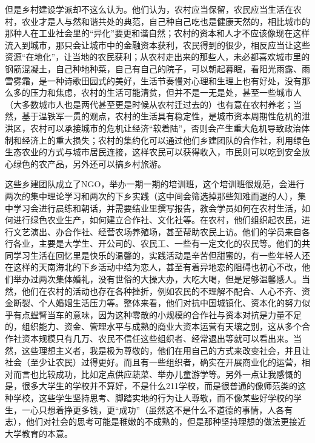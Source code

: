 但是乡村建设学派却不这么认为。他们认为，农村应当保留，农民应当生活在农村，农业才是人与然和谐共处的典范，自己种自己吃也是健康天然的，相比城市的那种人在工业社会里的“异化”要更和谐自然；农村的资本和人才不应该像现在这样流入到城市，那只会让城市中的金融资本获利，农民得到的很少，相反应当让这些资源“在地化”，让当地的农民获利；从农村走出来的那些人，未必都喜欢城市里的钢筋混凝土，自己种地种菜，自己有自己的院子，可以朝起暮眠，看阳光雨露、雨雪雾霜，是一种诗歌田园式的美好，生活节奏慢对心理和生理上也有好处，没有那么多的压力和焦虑，农村的生活可能清贫，但并不是一无是处，甚至一些城市人（大多数城市人也是两代甚至更是时候从农村迁过去的）也有意在农村养老；当然，基于温铁军一贯的观点，农村的生活具有稳定性，是城市资本周期性危机的泄洪区，农村可以承接城市的危机让经济“软着陆”，否则会产生重大危机导致政治体制和经济上的重大损失；农村的集约化可以通过他们乡建团队的合作社，利用绿色生态农业的方式与城市居民连接，这样农民可以获得收入，市民则可以吃到安全放心绿色的农产品，另外还可以搞乡村旅游。

这些乡建团队成立了NGO，举办一期一期的培训班，这个培训班很规范，会进行两次的集中理论学习和两次的下乡实践（这中间会筛选掉那些知难而退的人），集中学习会进行晨练和朝话，并需要结业里撰写报告，教会学员如何在农村生活，如何进行绿色农业生产，如何建立合作社、文化社等。在农村，他们组织起农民，进行文艺演出、办合作社、经营农场养殖场，甚至帮助农民上访。他们的学员来自各行各业，主要是大学生、开公司的、农民工、一些有一定文化的农民等。他们的共同学习生活在回忆里是快乐的温馨的，实践活动是辛苦但甜蜜的，有一些年轻人还在这样的天南海北的下乡活动中结为恋人，甚至有着异地恋的阻碍也初心不改，他们举办过两次集体婚礼，没有世俗的大操大办，大吃大喝，但是足够温馨感人。当然，他们在农村的活动也存在各种挫折，例如农民的不理解不配合、人心不齐、资金断裂、个人婚姻生活压力等。整体来看，他们对抗中国城镇化、资本化的努力似乎有点螳臂当车的意味，因为这种零散的小规模的合作社与资本对抗是力量不足的，组织能力、资金、管理水平与成熟的商业大资本运营有天壤之别，这从多个合作社资本规模只有几万、农民不信任这些组织者、经常退出等就可以看出来。当然，这些理想主义者，我是极为尊敬的，他们在用自己的方式来改变社会，并且让社会（至少让农民）过得更好。而且有一些组织者，确实在开展商业化的运营，相对而言也比较成功，比如定点供应蔬菜、举办儿童游学等。另外一点让我感慨的是，很多大学生的学校并不算好，不是什么211学校，而是很普通的像师范类的这种学校，这些学生坚持思考、脚踏实地的行为让人尊敬，而不像某些好学校的学生，一心只想着挣更多钱，更“成功”（虽然这不是什么不道德的事情，人各有志），他们对社会的思考可能是稚嫩的不成熟的，但是那种坚持理想的做法更接近大学教育的本意。

